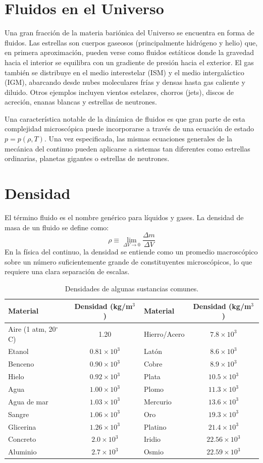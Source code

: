 \section{Fluidos en el Universo}
Una gran fracción de la materia bariónica del Universo se encuentra en forma de fluidos. Las estrellas son cuerpos gaseosos (principalmente hidrógeno y helio) que, en primera aproximación, pueden verse como fluidos estáticos donde la gravedad hacia el interior se equilibra con un gradiente de presión hacia el exterior. El gas también se distribuye en el medio interestelar (ISM) y el medio intergaláctico (IGM), abarcando desde nubes moleculares frías y densas hasta gas caliente y diluido. Otros ejemplos incluyen vientos estelares, chorros (jets), discos de acreción, enanas blancas y estrellas de neutrones.

Una característica notable de la dinámica de fluidos es que gran parte de esta complejidad microscópica puede incorporarse a través de una ecuación de estado $p = p(\rho, T)$. Una vez especificada, las mismas ecuaciones generales de la mecánica del continuo pueden aplicarse a sistemas tan diferentes como estrellas ordinarias, planetas gigantes o estrellas de neutrones.

\section{Densidad}
El término fluido es el nombre genérico para líquidos y gases. La densidad de masa de un fluido se define como:
$$ \rho \equiv \lim_{\Delta V \to 0} \frac{\Delta m}{\Delta V} $$
En la física del continuo, la densidad se entiende como un promedio macroscópico sobre un número suficientemente grande de constituyentes microscópicos, lo que requiere una clara separación de escalas.

\begin{table}[htbp]
\centering
\begin{tabular}{l c | l c}
\hline
\textbf{Material} & \textbf{Densidad (kg/m$^3$)} & \textbf{Material} & \textbf{Densidad (kg/m$^3$)} \\
\hline
Aire (1 atm, 20$^\circ$C) & 1.20 & Hierro/Acero & $7.8 \times 10^3$ \\
Etanol & $0.81 \times 10^3$ & Latón & $8.6 \times 10^3$ \\
Benceno & $0.90 \times 10^3$ & Cobre & $8.9 \times 10^3$ \\
Hielo & $0.92 \times 10^3$ & Plata & $10.5 \times 10^3$ \\
Agua & $1.00 \times 10^3$ & Plomo & $11.3 \times 10^3$ \\
Agua de mar & $1.03 \times 10^3$ & Mercurio & $13.6 \times 10^3$ \\
Sangre & $1.06 \times 10^3$ & Oro & $19.3 \times 10^3$ \\
Glicerina & $1.26 \times 10^3$ & Platino & $21.4 \times 10^3$ \\
Concreto & $2.0 \times 10^3$ & Iridio & $22.56 \times 10^3$ \\
Aluminio & $2.7 \times 10^3$ & Osmio & $22.59 \times 10^3$ \\
\hline
\end{tabular}
\caption{Densidades de algunas sustancias comunes.}
\end{table}

